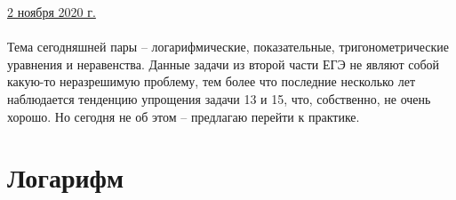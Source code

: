 \documentclass{article}
\begin{document}
\large
\begin{flushleft}
\underline{2 ноября 2020 г.} 
\end{flushleft}
\paragraph{}
Тема сегодняшней пары -- логарифмические, показательные, тригонометрические уравнения и неравенства.
Данные задачи из второй части ЕГЭ не являют собой какую-то неразрешимую проблему, тем более что последние несколько
лет наблюдается тенденцию упрощения задачи 13 и 15, что, собственно, не очень хорошо. Но сегодня не об этом --
предлагаю перейти к практике. 
 
\section{Логарифм}
\end{document}
